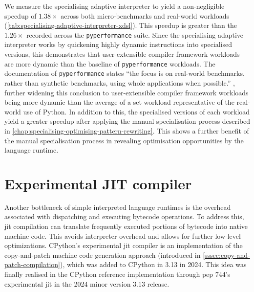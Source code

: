We measure the specialising adaptive interpreter to yield a non-negligible speedup of $1.38\times$ across both micro-benchmarks and real-world workloads (\autoref{tab:specialising-adaptive-interpreter-xdsl}).
This speedup is greater than the $1.26\times$ recorded across the \texttt{pyperformance} suite. Since the specialising adaptive interpreter works by quickening highly dynamic instructions into specialised versions, this demonstrates that user-extensible compiler framework workloads are more dynamic than the baseline of \texttt{pyperformance} workloads.
The documentation of \texttt{pyperformance} states ``the focus is on real-world benchmarks, rather than synthetic benchmarks, using whole applications when possible.'' \cite{collinwinterPythonPyperformance2025}, further widening this conclusion to user-extensible compiler framework workloads being more dynamic than the average of a set workload representative of the real-world use of Python.
In addition to this, the specialised versions of each workload yield a greater speedup after applying the manual specialisation process described in \autoref{chap:specialising-optimising-pattern-rewriting}. This shows a further benefit of the manual specialisation process in revealing optimisation opportunities by the language runtime.



\section{Experimental JIT compiler}
\label{sec:experimental-jit-compiler}

Another bottleneck of simple interpreted language runtimes is the overhead associated with dispatching and executing bytecode operations.
To address this, \acf{jit} compilation can translate frequently executed portions of bytecode into native machine code. This avoids interpreter overhead and allows for further low-level optimizations.
CPython's experimental \ac{jit} compiler is an implementation of the copy-and-patch machine code generation approach (introduced in \autoref{sssec:copy-and-patch-compilation}), which was added to CPython in 3.13 in 2024.
This idea was finally realised in the CPython reference implementation through \ac{pep} 744's experimental \ac{jit} in the 2024 minor version 3.13 release.

